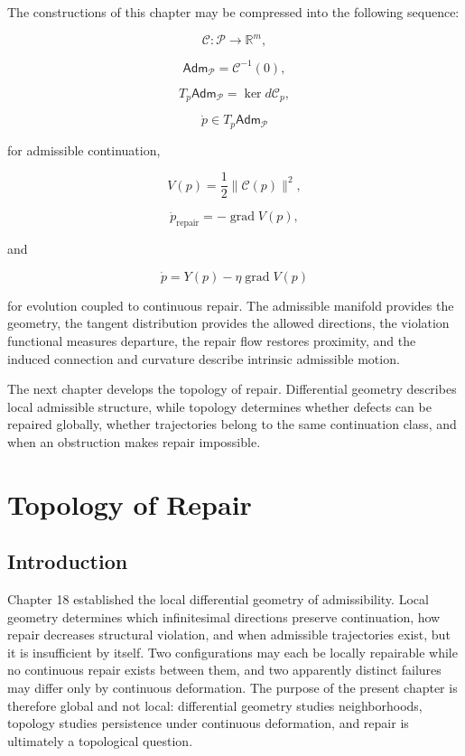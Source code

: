 \documentclass[11pt,oneside]{book}
\numberwithin{equation}{chapter}
\theoremstyle{definition}
\theoremstyle{plain}
\DeclareMathOperator{\grad}{grad}
\newcommand{\Adm}{\mathsf{Adm}}
\begin{document}
The constructions of this chapter may be compressed into the following
sequence:

\[
\mathcal C:
\mathcal P
\longrightarrow
\mathbb R^m,
\]

\[
\Adm_{\mathcal P}
=
\mathcal C^{-1}(0),
\]

\[
T_p\Adm_{\mathcal P}
=
\ker d\mathcal C_p,
\]

\[
\dot p
\in
T_p\Adm_{\mathcal P}
\]

for admissible continuation,

\[
V(p)
=
\frac12
\|\mathcal C(p)\|^2,
\]

\[
\dot p_{\mathrm{repair}}
=
-\grad V(p),
\]

and

\[
\dot p
=
Y(p)
-
\eta\grad V(p)
\]

for evolution coupled to continuous repair. The admissible manifold provides the geometry, the tangent distribution provides the allowed directions, the violation functional measures departure, the repair flow restores proximity, and the induced connection and curvature describe intrinsic admissible motion.

The next chapter develops the topology of repair. Differential geometry describes local admissible structure, while topology determines whether defects can be repaired globally, whether trajectories belong to the same continuation class, and when an obstruction makes repair impossible.

\chapter{Topology of Repair}

\section{Introduction}

Chapter 18 established the local differential geometry of admissibility. Local geometry determines which infinitesimal directions preserve continuation, how repair decreases structural violation, and when admissible trajectories exist, but it is insufficient by itself. Two configurations may each be locally repairable while no continuous repair exists between them, and two apparently distinct failures may differ only by continuous deformation. The purpose of the present chapter is therefore global and not local: differential geometry studies neighborhoods, topology studies persistence under continuous deformation, and repair is ultimately a topological question.
\end{document}
